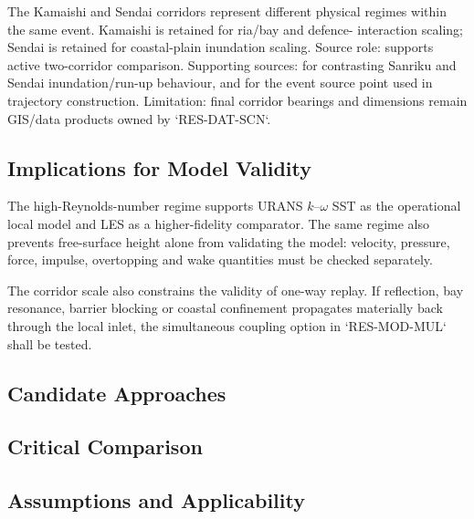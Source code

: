 The Kamaishi and Sendai corridors represent different physical regimes
within the same event. Kamaishi is retained for ria/bay and defence-
interaction scaling; Sendai is retained for coastal-plain inundation
scaling. Source role: supports active two-corridor comparison.
Supporting sources: \textcite{mori2012nationwide} for contrasting
Sanriku and Sendai inundation/run-up behaviour, and
\textcite{usgs2011tohokuEvent} for the event source point used in
trajectory construction. Limitation: final corridor bearings and
dimensions remain GIS/data products owned by `RES-DAT-SCN`.

\subsection{Implications for Model Validity}
\label{sec:res-phy-scl-model-validity-implications}


The high-Reynolds-number regime supports URANS $k$--$\omega$ SST as the
operational local model and LES as a higher-fidelity comparator. The
same regime also prevents free-surface height alone from validating the
model: velocity, pressure, force, impulse, overtopping and wake
quantities must be checked separately.

The corridor scale also constrains the validity of one-way replay.
If reflection, bay resonance, barrier blocking or coastal confinement
propagates materially back through the local inlet, the simultaneous
coupling option in `RES-MOD-MUL` shall be tested.

\subsection{Candidate Approaches}
\label{sec:res-phy-scl-candidate-approaches}


\subsection{Critical Comparison}
\label{sec:res-phy-scl-critical-comparison}


\subsection{Assumptions and Applicability}
\label{sec:res-phy-scl-assumptions}

